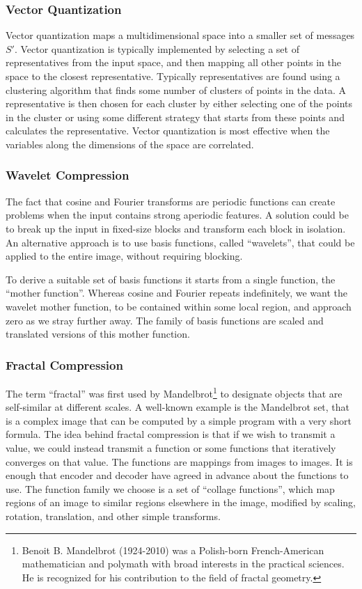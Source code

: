 \documentclass[12pt, a4paper]{report}
\begin{document}
\subsubsection{Vector Quantization}

Vector quantization maps a multidimensional space into a smaller set of messages \(S'\).
Vector quantization is typically implemented by selecting a set of representatives from the input space, and then mapping all
other points in the space to the closest representative.
Typically representatives are found using a clustering algorithm that finds some number of clusters of points in the data.
A representative is then chosen for each cluster by either selecting one of the points in the cluster or using some different
strategy that starts from these points and calculates the representative.
Vector quantization is most effective when the variables along the dimensions of the space are correlated.

\subsubsection{Wavelet Compression}

The fact that cosine and Fourier transforms are periodic functions can create problems when the input contains strong aperiodic
features.
A solution could be to break up the input in fixed-size blocks and transform each block in isolation.
An alternative approach is to use basis functions, called ``wavelets'', that could be applied to the entire image, without requiring
blocking.

To derive a suitable set of basis functions it starts from a single function, the ``mother function''.
Whereas cosine and Fourier repeats indefinitely, we want the wavelet mother function, to be contained within some local region,
and approach zero as we stray further away.
The family of basis functions are scaled and translated versions of this mother function.

\subsubsection{Fractal Compression}

The term ``fractal'' was first used by Mandelbrot\footnote{Benoit B. Mandelbrot (1924-2010) was a Polish-born French-American
mathematician and polymath with broad interests in the practical sciences. He is recognized for his contribution to the field of
fractal geometry.} to designate objects that are self-similar at different scales.
A well-known example is the Mandelbrot set, that is a complex image that can be computed by a simple program with a very short
formula.
The idea behind fractal compression is that if we wish to transmit a value, we could instead transmit a function or some functions
that iteratively converges on that value.
The functions are mappings from images to images.
It is enough that encoder and decoder have agreed in advance about the functions to use.
The function family we choose is a set of ``collage functions'', which map regions of an image to similar regions elsewhere in the
image, modified by scaling, rotation, translation, and other simple transforms.
\end{document}
